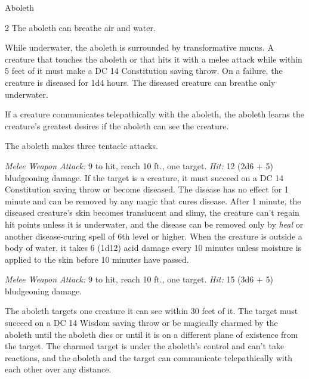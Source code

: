 \documentclass[10pt,a4paper,twoside,bg=print,twocolumn,openany,nodeprecatedcode]{dndbook}
\begin{document}
\begin{DndMonster}[float*=b,width=\textwidth + 8pt]{Aboleth}
\begin{multicols}{2}
\DndMonsterBasics[
armor-class = {17 (natural armor)},
hit-points = {\DndDice{18d10 + 36}},
speed = {10 ft., swim 40 ft.}
]
\DndMonsterAbilityScores[
 str = 21,
 dex = 9,
 con = 15,
 int = 18,
 wis = 15,
 cha = 18
]
\DndMonsterDetails[
saving-throws = {Con +6, Int +8, Wis +6},
skills = {History +12, Perception +10},
senses = {darkvision 120 ft., passive perception 20},
languages = {Deep Speech, telepathy 120 ft.},
challenge = 10,
]
The aboleth can breathe air and water.

While underwater, the aboleth is surrounded by transformative mucus. A creature that touches the aboleth or that hits it with a melee attack while within 5 feet of it must make a DC 14 Constitution saving throw. On a failure, the creature is diseased for 1d4 hours. The diseased creature can breathe only underwater.

If a creature communicates telepathically with the aboleth, the aboleth learns the creature's greatest desires if the aboleth can see the creature.

The aboleth makes three tentacle attacks.

\textsl{Melee Weapon Attack:} 9 to hit, reach 10 ft., one target. \textsl{Hit:} 12 (2d6 + 5) bludgeoning damage. If the target is a creature, it must succeed on a DC 14 Constitution saving throw or become diseased. The disease has no effect for 1 minute and can be removed by any magic that cures disease. After 1 minute, the diseased creature's skin becomes translucent and slimy, the creature can't regain hit points unless it is underwater, and the disease can be removed only by \textit{heal} or another disease-curing spell of 6th level or higher. When the creature is outside a body of water, it takes 6 (1d12) acid damage every 10 minutes unless moisture is applied to the skin before 10 minutes have passed.

\textsl{Melee Weapon Attack:} 9 to hit, reach 10 ft., one target. \textsl{Hit:} 15 (3d6 + 5) bludgeoning damage.

The aboleth targets one creature it can see within 30 feet of it. The target must succeed on a DC 14 Wisdom saving throw or be magically charmed by the aboleth until the aboleth dies or until it is on a different plane of existence from the target. The charmed target is under the aboleth's control and can't take reactions, and the aboleth and the target can communicate telepathically with each other over any distance.


\end{multicols}
\end{DndMonster}
\end{document}
